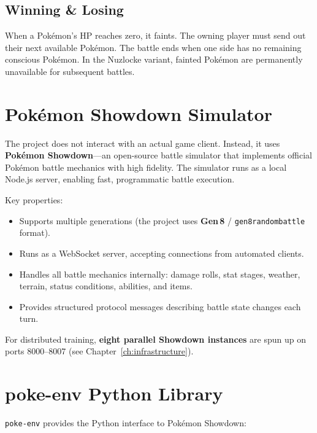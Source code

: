 
\subsection{Winning \& Losing}

When a Pok\'{e}mon's HP reaches zero, it faints.  The owning player must send
out their next available Pok\'{e}mon.  The battle ends when one side has no
remaining conscious Pok\'{e}mon.  In the Nuzlocke variant, fainted Pok\'{e}mon
are permanently unavailable for subsequent battles.

\section{Pok\'{e}mon Showdown Simulator}

The project does not interact with an actual game client.  Instead, it uses
\textbf{Pok\'{e}mon Showdown}---an open-source battle simulator that
implements official Pok\'{e}mon battle mechanics with high fidelity.  The
simulator runs as a local Node.js server, enabling fast, programmatic battle
execution.

Key properties:

\begin{itemize}
  \item Supports multiple generations (the project uses \textbf{Gen\,8} /
        \texttt{gen8randombattle} format).
  \item Runs as a WebSocket server, accepting connections from automated
        clients.
  \item Handles all battle mechanics internally: damage rolls, stat stages,
        weather, terrain, status conditions, abilities, and items.
  \item Provides structured protocol messages describing battle state changes
        each turn.
\end{itemize}

For distributed training, \textbf{eight parallel Showdown instances} are spun
up on ports 8000--8007 (see Chapter~\ref{ch:infrastructure}).

\section{poke-env Python Library}

\texttt{poke-env} provides the Python interface to Pok\'{e}mon Showdown:

